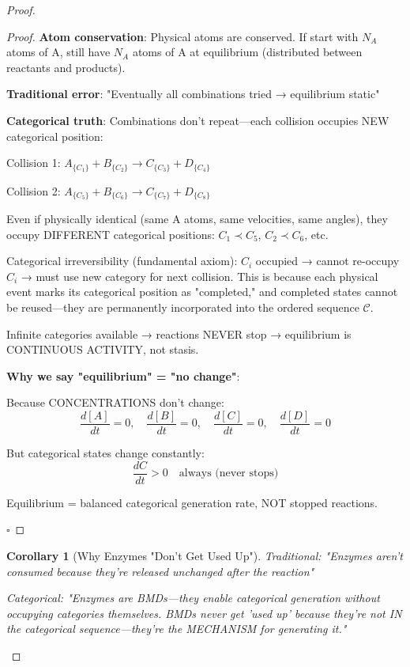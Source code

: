 \documentclass[11pt,a4paper]{article}
\newtheorem{corollary}[theorem]{Corollary}
\begin{document}
\begin{proof}
\begin{proof}
\textbf{Atom conservation}: Physical atoms are conserved. If start with $N_A$ atoms of A, still have $N_A$ atoms of A at equilibrium (distributed between reactants and products).

\textbf{Traditional error}: "Eventually all combinations tried → equilibrium static"

\textbf{Categorical truth}: Combinations don't repeat—each collision occupies NEW categorical position:

Collision 1: $A_{\{C_1\}} + B_{\{C_2\}} \to C_{\{C_3\}} + D_{\{C_4\}}$

Collision 2: $A_{\{C_5\}} + B_{\{C_6\}} \to C_{\{C_7\}} + D_{\{C_8\}}$

Even if physically identical (same A atoms, same velocities, same angles), they occupy DIFFERENT categorical positions: $C_1 \prec C_5$, $C_2 \prec C_6$, etc.

Categorical irreversibility (fundamental axiom): $C_i$ occupied → cannot re-occupy $C_i$ → must use new category for next collision. This is because each physical event marks its categorical position as "completed," and completed states cannot be reused—they are permanently incorporated into the ordered sequence $\mathcal{C}$.

Infinite categories available → reactions NEVER stop → equilibrium is CONTINUOUS ACTIVITY, not stasis.

\textbf{Why we say "equilibrium" = "no change"}:

Because CONCENTRATIONS don't change:
\begin{equation}
\frac{d[A]}{dt} = 0, \quad \frac{d[B]}{dt} = 0, \quad \frac{d[C]}{dt} = 0, \quad \frac{d[D]}{dt} = 0
\end{equation}

But categorical states change constantly:
\begin{equation}
\frac{dC}{dt} > 0 \quad \text{always (never stops)}
\end{equation}

Equilibrium = balanced categorical generation rate, NOT stopped reactions.

$\square$
\end{proof}

\begin{corollary}[Why Enzymes "Don't Get Used Up"]
Traditional: "Enzymes aren't consumed because they're released unchanged after the reaction"

Categorical: "Enzymes are BMDs—they enable categorical generation without occupying categories themselves. BMDs never get 'used up' because they're not IN the categorical sequence—they're the MECHANISM for generating it."
\end{corollary}


\end{proof}
\end{document}
